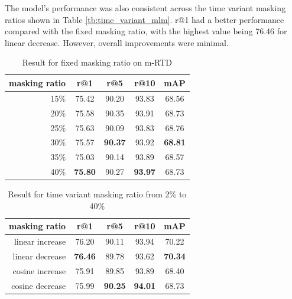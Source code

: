 The model's performance was also consistent across the time variant masking ratios shown in Table \ref{tb:time_variant_mlm}. r@1 had a better performance compared with the fixed masking ratio, with the highest value being 76.46 for linear decrease. However, overall improvements were minimal.



\begin{table}[htbp]
  \centering
  \caption{Result for fixed masking ratio on m-RTD}
  \label{tb:mrtd_fixed}
  \begin{tabular}{rcccc}
    masking ratio & r@1 & r@5 & r@10 & mAP \\ \hline
    15\% & 75.42 & 90.20 & 93.83 & 68.56 \\
    20\% & 75.58 & 90.35 & 93.91 & 68.73 \\
    25\% & 75.63 & 90.09 & 93.83 & 68.76 \\
    30\% & 75.57 & \textbf{90.37} & 93.92 & \textbf{68.81} \\
    35\% & 75.03 & 90.14 & 93.89 & 68.57 \\
    40\% & \textbf{75.80} & 90.27 & \textbf{93.97} & 68.73
  \end{tabular}
\end{table}

\begin{table}[htbp]
  \centering
  \caption{Result for time variant masking ratio from 2\% to 40\%}
  \label{tb:mrtd_time_variant}
  \begin{tabular}{rcccc}
    \centering
    masking ratio & r@1 & r@5 & r@10 & mAP\\ \hline
    linear increase & 76.20 & 90.11 & 93.94 & 70.22 \\
    linear decrease & \textbf{76.46} & 89.78 & 93.62 & \textbf{70.34} \\
    cosine increase & 75.91 & 89.85 & 93.89 & 68.40 \\
    cosine decrease & 75.99 & \textbf{90.25} & \textbf{94.01} & 68.73 \\
  \end{tabular}
\end{table}


